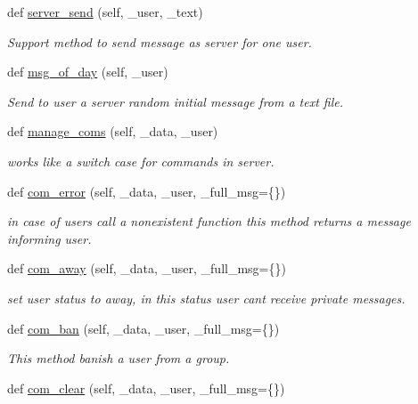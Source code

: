 \begin{DoxyCompactItemize}
def \hyperlink{classlib_1_1server_1_1_server_a054e900a412a025b96f82be3dbdceb80}{server\+\_\+send} (self, \+\_\+user, \+\_\+text)
\begin{DoxyCompactList}\small\item\em Support method to send message as server for one user. \end{DoxyCompactList}\item 
def \hyperlink{classlib_1_1server_1_1_server_a01a04db3e7fcf1644df2267b4bce8bf3}{msg\+\_\+of\+\_\+day} (self, \+\_\+user)
\begin{DoxyCompactList}\small\item\em Send to user a server random initial message from a text file. \end{DoxyCompactList}\item 
def \hyperlink{classlib_1_1server_1_1_server_a9a4f143acb36a5f11b237d6a32e6aac1}{manage\+\_\+coms} (self, \+\_\+data, \+\_\+user)
\begin{DoxyCompactList}\small\item\em works like a switch case for commands in server. \end{DoxyCompactList}\item 
def \hyperlink{classlib_1_1server_1_1_server_a69a54eab9ebf3df833d0bf9512b85997}{com\+\_\+error} (self, \+\_\+data, \+\_\+user, \+\_\+full\+\_\+msg=\{\})
\begin{DoxyCompactList}\small\item\em in case of users call a nonexistent function this method returns a message informing user. \end{DoxyCompactList}\item 
def \hyperlink{classlib_1_1server_1_1_server_a2ab2a05b00d14c679b2e7582891681ce}{com\+\_\+away} (self, \+\_\+data, \+\_\+user, \+\_\+full\+\_\+msg=\{\})
\begin{DoxyCompactList}\small\item\em set user status to away, in this status user can\textquotesingle{}t receive private messages. \end{DoxyCompactList}\item 
def \hyperlink{classlib_1_1server_1_1_server_aa954164c86ddf905d0ed8c48e2b7a087}{com\+\_\+ban} (self, \+\_\+data, \+\_\+user, \+\_\+full\+\_\+msg=\{\})
\begin{DoxyCompactList}\small\item\em This method banish a user from a group. \end{DoxyCompactList}\item 
def \hyperlink{classlib_1_1server_1_1_server_a6f932b1311da5f3b9a49642aea4243d6}{com\+\_\+clear} (self, \+\_\+data, \+\_\+user, \+\_\+full\+\_\+msg=\{\})

\end{DoxyCompactItemize}
